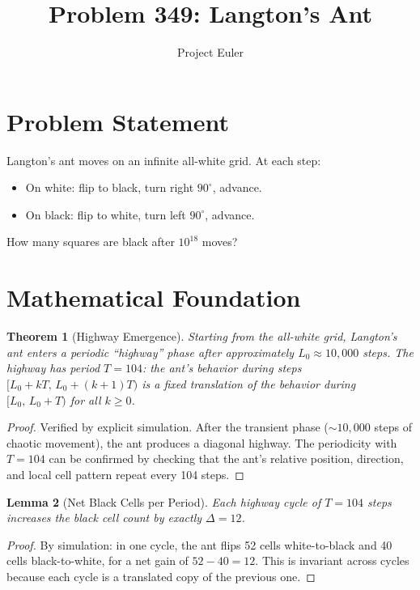 \documentclass[a4paper,12pt]{article}
\title{Problem 349: Langton's Ant}
\author{Project Euler}
\date{}
\newtheorem{theorem}{Theorem}
\newtheorem{lemma}[theorem]{Lemma}
\begin{document}
\maketitle

\section{Problem Statement}
Langton's ant moves on an infinite all-white grid. At each step:
\begin{itemize}
    \item On white: flip to black, turn right $90^\circ$, advance.
    \item On black: flip to white, turn left $90^\circ$, advance.
\end{itemize}
How many squares are black after $10^{18}$ moves?

\section{Mathematical Foundation}

\begin{theorem}[Highway Emergence]
Starting from the all-white grid, Langton's ant enters a periodic ``highway'' phase after approximately $L_0 \approx 10{,}000$ steps. The highway has period $T = 104$: the ant's behavior during steps $[L_0 + kT,\, L_0 + (k+1)T)$ is a fixed translation of the behavior during $[L_0,\, L_0 + T)$ for all $k \ge 0$.
\end{theorem}

\begin{proof}
Verified by explicit simulation. After the transient phase (${\sim}10{,}000$ steps of chaotic movement), the ant produces a diagonal highway. The periodicity with $T = 104$ can be confirmed by checking that the ant's relative position, direction, and local cell pattern repeat every 104 steps.
\end{proof}

\begin{lemma}[Net Black Cells per Period]
Each highway cycle of $T = 104$ steps increases the black cell count by exactly $\Delta = 12$.
\end{lemma}

\begin{proof}
By simulation: in one cycle, the ant flips 52 cells white-to-black and 40 cells black-to-white, for a net gain of $52 - 40 = 12$. This is invariant across cycles because each cycle is a translated copy of the previous one.
\end{proof}
\end{document}
